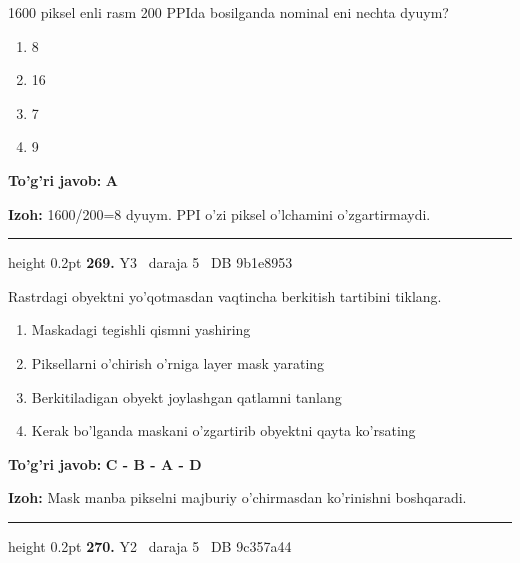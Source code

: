 \documentclass[10pt,a4paper,oneside]{article}
\begin{document}
\par
1600 piksel enli rasm 200 PPIda bosilganda nominal eni nechta dyuym?
\begin{enumerate}[label=\Alph*),leftmargin=9mm]
\item 8
\item 16
\item 7
\item 9
\end{enumerate}
\begin{tcolorbox}[enhanced,breakable,colback=teal!4,colframe=teal!45!black,boxrule=0.45pt,arc=1.2mm,left=2.8mm,right=2.8mm,top=2mm,bottom=2mm,before skip=2mm,after skip=2mm]
\textbf{\color{teal}To'g'ri javob:} \textbf{A}
\par\smallskip
\textbf{Izoh:} 1600/200=8 dyuym. PPI o'zi piksel o'lchamini o'zgartirmaydi.
\end{tcolorbox}
\vspace{2mm}\hrule height 0.2pt \vspace{4mm}
\hypertarget{q269}{\textbf{\color{ink}269.}}  {\color{muted}\scriptsize Y3 \textbullet\ daraja 5 \textbullet\ DB 9b1e8953}
\par
Rastrdagi obyektni yo'qotmasdan vaqtincha berkitish tartibini tiklang.
\begin{enumerate}[label=\Alph*),leftmargin=9mm]
\item Maskadagi tegishli qismni yashiring
\item Piksellarni o'chirish o'rniga layer mask yarating
\item Berkitiladigan obyekt joylashgan qatlamni tanlang
\item Kerak bo'lganda maskani o'zgartirib obyektni qayta ko'rsating
\end{enumerate}
\begin{tcolorbox}[enhanced,breakable,colback=teal!4,colframe=teal!45!black,boxrule=0.45pt,arc=1.2mm,left=2.8mm,right=2.8mm,top=2mm,bottom=2mm,before skip=2mm,after skip=2mm]
\textbf{\color{teal}To'g'ri javob:} \textbf{C - B - A - D}
\par\smallskip
\textbf{Izoh:} Mask manba pikselni majburiy o'chirmasdan ko'rinishni boshqaradi.
\end{tcolorbox}
\vspace{2mm}\hrule height 0.2pt \vspace{4mm}
\hypertarget{q270}{\textbf{\color{ink}270.}}  {\color{muted}\scriptsize Y2 \textbullet\ daraja 5 \textbullet\ DB 9c357a44}
\par
\end{document}

